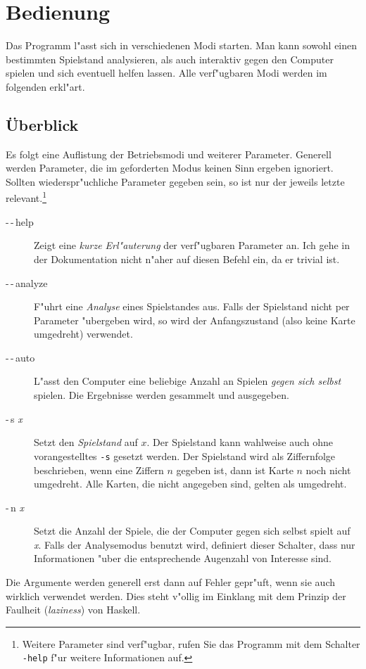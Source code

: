 \documentclass{scrreprt}
\begin{document}
\chapter{Bedienung}
Das Programm l"asst sich in verschiedenen Modi starten.  Man kann sowohl einen
bestimmten Spielstand analysieren, als auch interaktiv gegen den Computer
spielen und sich eventuell helfen lassen.  Alle verf"ugbaren Modi werden im
folgenden erkl"art.

\section{Überblick}
Es folgt eine Auflistung der Betriebsmodi und weiterer Parameter.  Generell
werden Parameter, die im geforderten Modus keinen Sinn ergeben ignoriert.
Sollten wiederspr"uchliche Parameter gegeben sein, so ist nur der jeweils letzte
relevant.\footnote{Weitere Parameter sind verf"ugbar, rufen Sie das Programm mit
dem Schalter \texttt {-\-help} f"ur weitere Informationen auf.}

\begin{description}
\item[-\,-\,help] Zeigt eine \emph{kurze Erl"auterung} der verf"ugbaren
  Parameter an.  Ich gehe in der Dokumentation nicht n"aher auf diesen Befehl
  ein, da er trivial ist.
\item[-\,-\,analyze] F"uhrt eine \emph{Analyse} eines Spielstandes aus.  Falls
  der Spielstand nicht per Parameter "ubergeben wird, so wird der Anfangszustand
  (also keine Karte umgedreht) verwendet.
\item[-\,-\,auto] L"asst den Computer eine beliebige Anzahl an Spielen \emph
  {gegen sich selbst} spielen.  Die Ergebnisse werden gesammelt und ausgegeben.
\item[-\,s \textit{x}] Setzt den \emph{Spielstand} auf $x$.  Der
  Spielstand kann wahlweise auch ohne vorangestelltes \texttt{-s} gesetzt
  werden.  Der Spielstand wird als Ziffernfolge beschrieben, wenn eine Ziffern
  $n$ gegeben ist, dann ist Karte $n$ noch nicht umgedreht.  Alle Karten, die
  nicht angegeben sind, gelten als umgedreht.
\item[-\,n \textit{x}] Setzt die Anzahl der Spiele, die der Computer gegen sich
  selbst spielt auf \textit{x}.  Falls der Analysemodus benutzt wird, definiert
  dieser Schalter, dass nur Informationen "uber die entsprechende Augenzahl von
  Interesse sind.
\end{description}
Die Argumente werden generell erst dann auf Fehler gepr"uft, wenn sie auch
wirklich verwendet werden.  Dies steht v"ollig im Einklang mit dem Prinzip der
Faulheit (\emph{laziness}) von Haskell.
\end{document}
